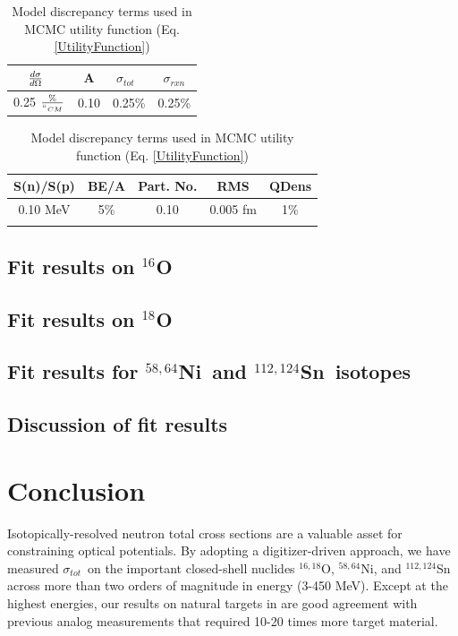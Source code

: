 \documentclass[twocolumn,secnumarabic,amssymb, nobibnotes, aps, prl,
superscriptaddress, nobalancelastpage]{revtex4}
\newcommand{\tot}{\ensuremath{\sigma_{tot}}}
\newcommand{\rxn}{\ensuremath{\sigma_{rxn}}}
\newcommand{\el}{\ensuremath{\frac{\lowercase{d}\sigma}{\lowercase{d}\Omega}}}
\newcommand{\niEightFour}{\ensuremath{^{58,64}}N\lowercase{i}}
\newcommand{\snTwelveFour}{\ensuremath{^{112,124}}S\lowercase{n}}
\begin{document}
\begin{table}[tb]
    \caption[Model discrepancy terms used in MCMC utility function (Eq.
    \ref{UtilityFunction})]
    {Model discrepancy terms used in MCMC utility function (Eq.
    \ref{UtilityFunction})}
    \label{ModelDiscrepancyTable}
    \centering
    \begin{tabular}{ c c c c }
        \hline
        \el\ & A & \tot\ & \rxn \\
        \hline
         0.25 $\frac{\%}{\degree_{CM}}$ & 0.10 & 0.25\% & 0.25\% \\
        \hline
    \end{tabular}

    \vfill

    \begin{tabular}{ c c c c c }
        \hline
        S(n)/S(p) & BE/A & Part. No. & RMS & QDens \\
        \hline
        0.10 MeV & 5\% & 0.10 & 0.005 fm & 1\% \\
        \\
        \hline
    \end{tabular}

\end{table}

\subsection{Fit results on $^{16}$O}

\subsection{Fit results on $^{18}$O}

\subsection{Fit results for \niEightFour\ and \snTwelveFour\ isotopes}

\subsection{Discussion of fit results}

\section{Conclusion}
Isotopically-resolved neutron total cross sections are a valuable asset for
constraining optical potentials. By adopting a digitizer-driven
approach, we have measured \tot\ on the important closed-shell nuclides
$^{16,18}$O, $^{58,64}$Ni, and $^{112,124}$Sn across more than two orders of
magnitude in energy (3-450 MeV). Except at the highest energies, our results
on natural targets in are good agreement with previous analog measurements
that required 10-20 times more target material. 
\end{document}
